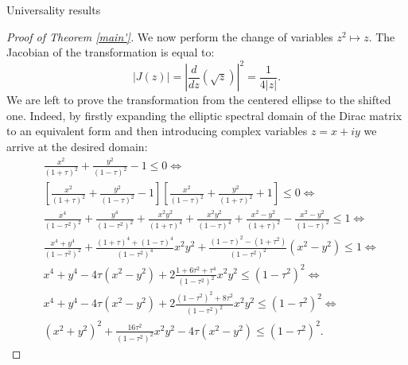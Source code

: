 \documentclass[11pt, a4paper, oneside]{book}
\numberwithin{equation}{chapter}
\newcommand{\beq}{\begin{equation}}
\newcommand{\eeq}{\end{equation}}
\begin{document}
\begin{section}{Universality results}
\begin{proof}[Proof of Theorem \ref{main'}]
We now perform the change of variables $z^2 \mapsto z.$ The Jacobian of the transformation is equal to:
\beq \label{Jacob}
|J(z)| = \left | \frac{d}{dz} (\sqrt{z}) \right |^2 = \frac{1}{4|z|} .
\eeq
We are left to prove the transformation from the centered ellipse to the shifted one. Indeed, by firstly expanding the elliptic spectral domain of the Dirac matrix to an equivalent form and then introducing complex variables $z=x+iy$ we arrive at the desired domain:
%
\begin{align*}
    &\frac{x^2}{(1+\tau)^2} + \frac{y^2}{(1-\tau)^2} - 1 \leq 0 \Leftrightarrow \\
    &\left [ \frac{x^2}{(1+\tau)^2} + \frac{y^2}{(1-\tau)^2} - 1 \right ] \left [ \frac{x^2}{(1-\tau)^2} + \frac{y^2}{(1+\tau)^2} + 1 \right ] \leq 0 \Leftrightarrow \\
    &\frac{x^4}{(1-\tau^2)^2} + \frac{y^4}{(1-\tau^2)^2} + \frac{x^2 y^2}{(1+\tau)^4} + \frac{x^2y^2}{(1-\tau)^4} + \frac{x^2 - y^2}{(1+\tau)^2} - \frac{x^2-y^2}{(1-\tau)^2} \leq 1 \Leftrightarrow \\
    &\frac{x^4+y^4}{(1-\tau^2)^2} + \frac{(1+\tau)^4+(1-\tau)^4}{(1-\tau^2)^4}x^2y^2 + \frac{(1-\tau)^2 - (1+\tau^2)}{(1-\tau^2)^2} (x^2-y^2) \leq 1 \Leftrightarrow \\
    &x^4+y^4 - 4\tau(x^2-y^2) + 2\frac{1+6\tau^2 +\tau^4}{(1-\tau^2)^2}x^2y^2 \leq (1-\tau^2)^2 \Leftrightarrow \\
    &x^4+y^4 - 4\tau (x^2-y^2) + 2\frac{(1-\tau^2)^2 + 8\tau^2}{(1-\tau^2)^2}x^2y^2 \leq (1-\tau^2)^2 \Leftrightarrow \\
    &(x^2+y^2)^2 + \frac{16\tau^2}{(1-\tau^2)^2}x^2y^2 - 4\tau(x^2-y^2) \leq (1-\tau^2)^2 .
\end{align*}
%
\pagebreak


\end{proof}
\end{section}
\end{document}
